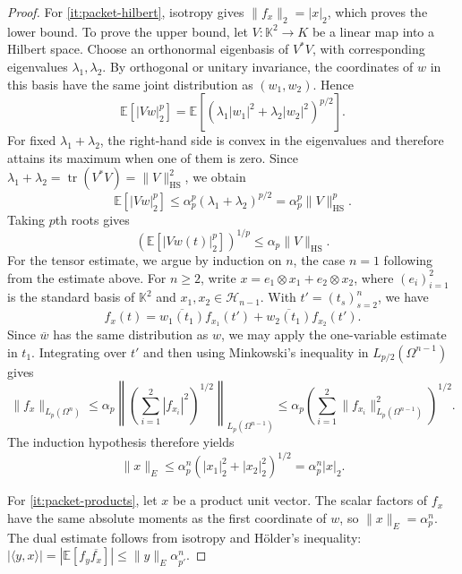 \documentclass[11pt,a4paper,reqno]{amsart}
\theoremstyle{definition}
\newcommand{\norm}[1]{\lVert #1\rVert}
\DeclareMathOperator{\tr}{tr}
\numberwithin{equation}{section}
\begin{document}
\begin{proof}
For \ref{it:packet-hilbert}, isotropy gives $\norm{f_x}_2=|x|_2$, which proves the lower bound. To prove the upper bound, let $V\colon\mathbb K^2\to K$ be a linear map into a Hilbert space. Choose an orthonormal eigenbasis of $V^*V$, with corresponding eigenvalues $\lambda_1,\lambda_2$. By orthogonal or unitary invariance, the coordinates of $w$ in this basis have the same joint distribution as $(w_1,w_2)$. Hence
\begin{equation*}
 \mathbb E[|Vw|_2^p]
 =\mathbb E\left[(\lambda_1|w_1|^2+\lambda_2|w_2|^2)^{p/2}\right].
\end{equation*}
For fixed $\lambda_1+\lambda_2$, the right-hand side is convex in the eigenvalues and therefore attains its maximum when one of them is zero. Since $\lambda_1+\lambda_2=\tr(V^*V)=\norm V_{\mathrm{HS}}^2$, we obtain
\begin{equation*}
 \mathbb E[|Vw|_2^p]
 \leq\alpha_p^p(\lambda_1+\lambda_2)^{p/2}
 =\alpha_p^p\norm V_{\mathrm{HS}}^p.
\end{equation*}
Taking $p$th roots gives
\begin{equation*}
 (\mathbb E[|Vw(t)|_2^p])^{1/p}\leq\alpha_p\norm V_{\mathrm{HS}}.
\end{equation*}
For the tensor estimate, we argue by induction on $n$, the case $n=1$ following from the estimate above. For $n\geq2$, write $x=e_1\otimes x_1+e_2\otimes x_2$, where $(e_i)_{i=1}^2$ is the standard basis of $\mathbb K^2$ and $x_1,x_2\in\mathcal H_{n-1}$. With $t'=(t_s)_{s=2}^n$, we have
\begin{equation*}
 f_x(t)=\overline{w_1(t_1)}f_{x_1}(t')+\overline{w_2(t_1)}f_{x_2}(t').
\end{equation*}
Since $\overline w$ has the same distribution as $w$, we may apply the one-variable estimate in $t_1$. Integrating over $t'$ and then using Minkowski's inequality in $L_{p/2}(\Omega^{n-1})$ gives
\begin{equation*}
 \norm{f_x}_{L_p(\Omega^n)}
 \leq\alpha_p\left\|\left(\sum_{i=1}^2|f_{x_i}|^2\right)^{1/2}\right\|_{L_p(\Omega^{n-1})}
 \leq\alpha_p\left(\sum_{i=1}^2\norm{f_{x_i}}_{L_p(\Omega^{n-1})}^2\right)^{1/2}.
\end{equation*}
The induction hypothesis therefore yields
\begin{equation*}
 \norm x_E\leq\alpha_p^n\left(|x_1|_2^2+|x_2|_2^2\right)^{1/2}
 =\alpha_p^n|x|_2.
\end{equation*}

For \ref{it:packet-products}, let $x$ be a product unit vector. The scalar factors of $f_x$ have the same absolute moments as the first coordinate of $w$, so $\norm x_E=\alpha_p^n$. The dual estimate follows from isotropy and H\"older's inequality: $|\langle y,x\rangle|=|\mathbb E[f_y\overline{f_x}]| \leq\norm y_E\alpha_{p'}^n$.


\end{proof}
\end{document}
